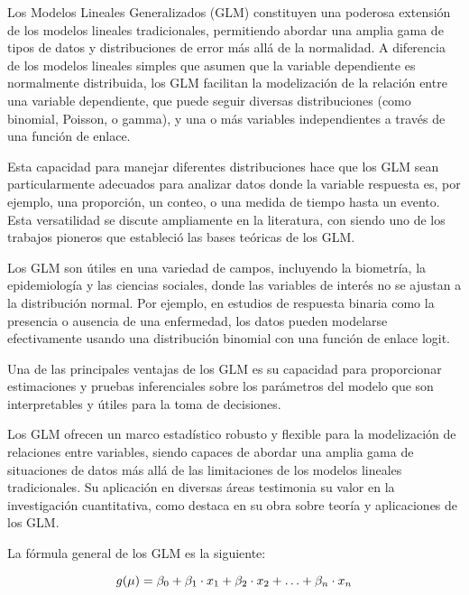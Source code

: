 \documentclass[
  11pt,
  bookmarksnumbered]{article}
\begin{document}
Los Modelos Lineales Generalizados (GLM) constituyen una poderosa extensión de los modelos lineales tradicionales, permitiendo abordar una amplia gama de tipos de datos y distribuciones de error más allá de la normalidad.
A diferencia de los modelos lineales simples que asumen que la variable dependiente es normalmente distribuida, los GLM facilitan la modelización de la relación entre una variable dependiente, que puede seguir diversas distribuciones (como binomial, Poisson, o gamma), y una o más variables independientes a través de una función de enlace.

Esta capacidad para manejar diferentes distribuciones hace que los GLM sean particularmente adecuados para analizar datos donde la variable respuesta es, por ejemplo, una proporción, un conteo, o una medida de tiempo hasta un evento.
Esta versatilidad se discute ampliamente en la literatura, con \autocite{nelder1972generalized} siendo uno de los trabajos pioneros que estableció las bases teóricas de los GLM.

Los GLM son útiles en una variedad de campos, incluyendo la biometría, la epidemiología y las ciencias sociales, donde las variables de interés no se ajustan a la distribución normal.
Por ejemplo, en estudios de respuesta binaria como la presencia o ausencia de una enfermedad, los datos pueden modelarse efectivamente usando una distribución binomial con una función de enlace logit.

Una de las principales ventajas de los GLM es su capacidad para proporcionar estimaciones y pruebas inferenciales sobre los parámetros del modelo que son interpretables y útiles para la toma de decisiones.

Los GLM ofrecen un marco estadístico robusto y flexible para la modelización de relaciones entre variables, siendo capaces de abordar una amplia gama de situaciones de datos más allá de las limitaciones de los modelos lineales tradicionales.
Su aplicación en diversas áreas testimonia su valor en la investigación cuantitativa, como destaca \textcite{mccullagh1989generalized} en su obra sobre teoría y aplicaciones de los GLM.

La fórmula general de los GLM es la siguiente: 

\begin{equation}
\large g(\mu) = \beta_0 + \beta_1 \cdot x_1 + \beta_2 \cdot x_2 + \ldots + \beta_n \cdot x_n\end{equation}
\end{document}
